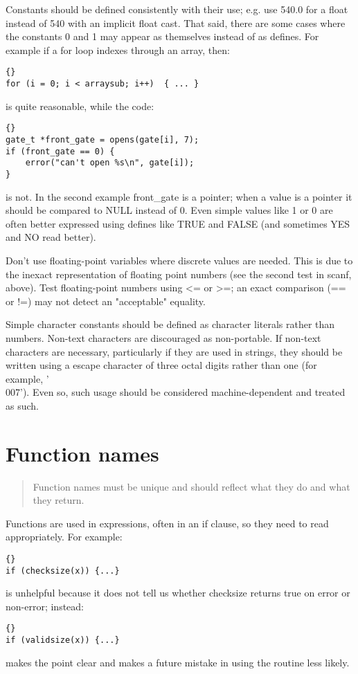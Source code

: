 \documentclass{report}
\begin{document}
Constants should be defined consistently with their use; e.g. use 540.0 for a float instead of 540 with an implicit float cast. That said, there are some cases where the constants 0 and 1 may appear as themselves instead of as defines. For example if a for loop indexes through an array, then: 
\begin{lstlisting}{}
for (i = 0; i < arraysub; i++)  { ... }
\end{lstlisting}
is quite reasonable, while the code: 
\begin{lstlisting}{}
gate_t *front_gate = opens(gate[i], 7);
if (front_gate == 0) {
    error("can't open %s\n", gate[i]);
}
\end{lstlisting}
is not. In the second example front\_gate is a pointer; when a value is a pointer it should be compared to NULL instead of 0. Even simple values like 1 or 0 are often better expressed using defines like TRUE and FALSE (and sometimes YES and NO read better).

Don't use floating-point variables where discrete values are needed. This is due to the inexact representation of floating point numbers (see the second test in scanf, above). Test floating-point numbers using <= or >=; an exact comparison (== or !=) may not detect an "acceptable" equality.

Simple character constants should be defined as character literals rather than numbers. Non-text characters are discouraged as non-portable. If non-text characters are necessary, particularly if they are used in strings, they should be written using a escape character of three octal digits rather than one (for example, '\\007'). Even so, such usage should be considered machine-dependent and treated as such. 

\section{Function names} 
\begin{quote}
Function names must be unique and should reflect what they do and what they return.
\end{quote}
Functions are used in expressions, often in an if clause, so they need to read appropriately. For example: 
\begin{lstlisting}{}
if (checksize(x)) {...}
\end{lstlisting}
is unhelpful because it does not tell us whether checksize returns true on error or non-error; instead:
\begin{lstlisting}{}
if (validsize(x)) {...}
\end{lstlisting}
makes the point clear and makes a future mistake in using the routine less likely. 
\end{document}
